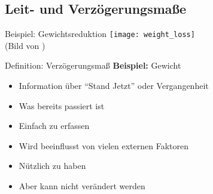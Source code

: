 %
%
%
%
%
%




\subsection{Leit- und Verzögerungsmaße}


\begin{frame}[c]{Beispiel: Gewichtsreduktion}
    \texttt{[image: weight\_loss]} \\
    (Bild von \cite{weight-loss-pic})
\end{frame}

\begin{frame}[c]{Definition: Verzögerungsmaß}
    \large
    \pause
    \textbf{Beispiel:} Gewicht
    \begin{itemize}[<+(1)->]
        \item Information über \enquote{Stand Jetzt} oder Vergangenheit
        \item Was bereits passiert ist
        \item Einfach zu erfassen
        \item Wird beeinflusst von vielen externen Faktoren
        \item Nützlich zu haben
        \item Aber kann nicht verändert werden
    \end{itemize}
\end{frame}


